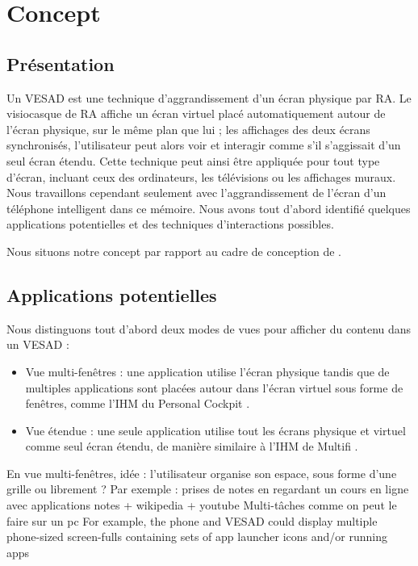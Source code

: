 \chapter{Concept}
\label{ch:concept}

\section{Présentation}
\label{sec:concept_introduction}

Un VESAD est une technique d'aggrandissement d'un écran physique par RA. Le visiocasque de RA affiche un écran virtuel placé automatiquement autour de l'écran physique, sur le même plan que lui ; les affichages des deux écrans synchronisés, l'utilisateur peut alors voir et interagir comme s'il s'aggissait d'un seul écran étendu. Cette technique peut ainsi être appliquée pour tout type d'écran, incluant ceux des ordinateurs, les télévisions ou les affichages muraux. Nous travaillons cependant seulement avec l'aggrandissement de l'écran d'un téléphone intelligent dans ce mémoire. Nous avons tout d'abord identifié quelques applications potentielles et des techniques d'interactions possibles.

Nous situons notre concept par rapport au cadre de conception de \cite{Ens2014a}.

\section{Applications potentielles}
\label{sec:concept_applications}

Nous distinguons tout d'abord deux modes de vues pour afficher du contenu dans un VESAD :
\begin{itemize}
  \item Vue multi-fenêtres  : une application utilise l'écran physique tandis que de multiples applications sont placées autour dans l'écran virtuel sous forme de fenêtres, comme l'IHM du Personal Cockpit \citep{Ens2014}.
  \item Vue étendue  : une seule application utilise tout les écrans physique et virtuel comme seul écran étendu, de manière similaire à l'IHM de Multifi \citep{Grubert2015}.
\end{itemize}
\bigskip

En vue multi-fenêtres, idée : l'utilisateur organise son espace, sous forme d'une grille ou librement ?
Par exemple : prises de notes en regardant un cours en ligne avec applications notes + wikipedia + youtube
Multi-tâches comme on peut le faire sur un pc
For example, the phone and VESAD could display multiple phone-sized screen-fulls containing sets of app launcher icons and/or running apps 


